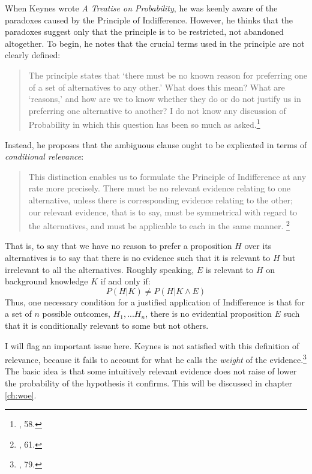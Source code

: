 When Keynes wrote \emph{A Treatise on Probability}, he was keenly aware
of the paradoxes caused by the Principle of Indifference. However, he
thinks that the paradoxes suggest only that the principle is to be
restricted, not abandoned altogether. To begin, he notes that the
crucial terms used in the principle are not clearly defined:

\begin{quote}
The principle states that `there must be no known reason for preferring
one of a set of alternatives to any other.' What does this mean? What
are `reasons,' and how are we to know whether they do or do not justify
us in preferring one alternative to another? I do not know any
discussion of Probability in which this question has been so much as
asked.\footnote{\cite{keynes}, 58.}
\end{quote}

Instead, he proposes that the ambiguous clause ought to be explicated in terms of
\emph{conditional relevance}: 

\begin{quote}
This distinction enables us to formulate the Principle of Indifference at any rate more precisely. There must be no relevant evidence relating to one alternative, unless there is corresponding evidence relating to the other; our relevant evidence, that is to say, must be symmetrical with regard to the alternatives, and must be applicable to each in the same manner.	\footnote{\cite{keynes}, 61.}
\end{quote}


That is, to say that we have no reason to prefer
a proposition \(H\) over its alternatives is to say that there is no
evidence such that it is relevant to \(H\) but irrelevant to all the
alternatives. Roughly speaking, \(E\) is relevant to \(H\) on background
knowledge \(K\) if and only if: \[P(H|K) \neq P(H|K\wedge E)\] Thus, one necessary condition for a justified application
of Indifference is that for a set of \(n\) possible outcomes,
\(H_1,...H_n\), there is no evidential proposition \(E\) such that it is
conditionally relevant to some but not others. 

I will flag an important issue here. Keynes is not satisfied with this definition of relevance, because it fails to account for what he calls the \emph{weight} of the evidence.\footnote{\cite{keynes}, 79.} The basic idea is that some intuitively relevant evidence does not raise of lower the probability of the hypothesis it confirms. This will be discussed in chapter \ref{ch:woe}.

